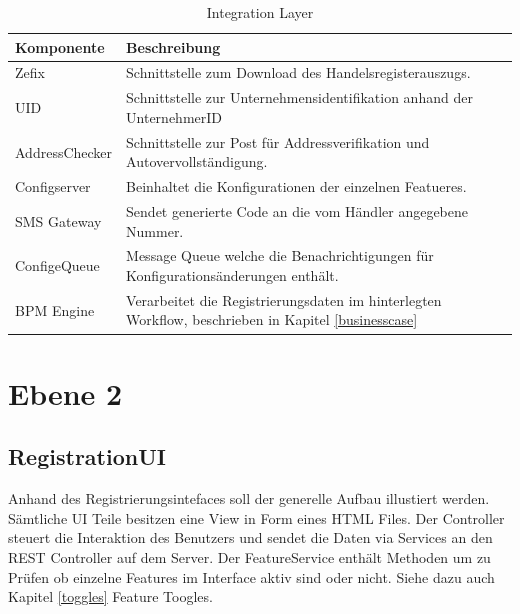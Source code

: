 \begin{table}[H]
	\centering
	\caption{Integration Layer}
	\begin{tabular}{ | p{4cm} | p{11cm} | }
		\toprule
		{\textbf{Komponente}} & {\textbf{Beschreibung}} \\
		\midrule
		Zefix &  Schnittstelle zum Download des Handelsregisterauszugs. \\ \hline
		UID &  Schnittstelle zur Unternehmensidentifikation anhand der UnternehmerID \\ \hline
		AddressChecker &  Schnittstelle zur Post für Addressverifikation und Autovervollständigung. \\ \hline
		Configserver &  Beinhaltet die Konfigurationen der einzelnen Featueres. \\ \hline
		SMS Gateway &  Sendet generierte Code an die vom Händler angegebene Nummer. \\ \hline
		ConfigeQueue & Message Queue welche die Benachrichtigungen für Konfigurationsänderungen enthält. \\ \hline
		BPM Engine & Verarbeitet die Registrierungsdaten im hinterlegten Workflow, beschrieben in Kapitel \ref{businesscase}\\
		\bottomrule
	\end{tabular}
\end{table}
\newpage

\section{Ebene 2}

\subsection{RegistrationUI}
Anhand des Registrierungsintefaces soll der generelle Aufbau illustiert werden. Sämtliche UI Teile besitzen eine View in Form eines HTML Files. Der Controller steuert die Interaktion des Benutzers und sendet die Daten via Services an den REST Controller auf dem Server. Der FeatureService enthält Methoden um zu Prüfen ob einzelne Features im Interface aktiv sind oder nicht. Siehe dazu auch Kapitel \ref{toggles} Feature Toogles.

